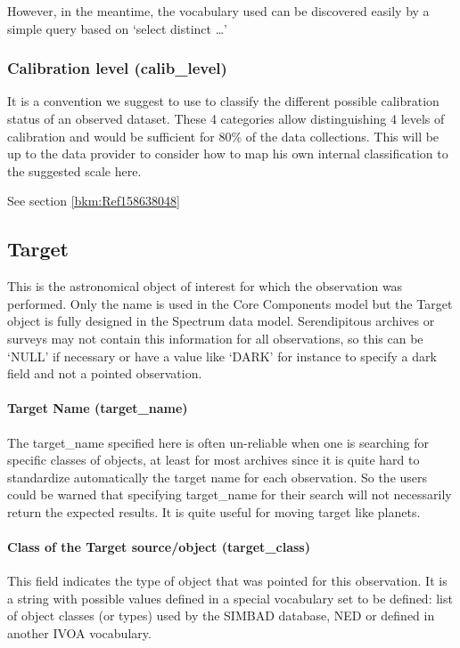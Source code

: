 \documentclass[11pt,a4paper]{ivoa}
\begin{document}
However, in the meantime, the vocabulary used can be discovered easily by a simple query based on `select distinct
{\dots}'

\subsubsection{Calibration level (calib\_level)}
It is a convention we suggest to use to classify the different possible calibration status of an observed dataset.
These 4 categories allow distinguishing 4 levels of calibration and would be sufficient for 80\% of the data
collections.  This will be up to the data provider to consider how to map his own internal classification to the
suggested scale here.

See section \ref{bkm:Ref158638048}

\subsection{Target}
This is the astronomical object of interest for which the observation was performed. Only the name is used in the Core
Components model but the Target object is fully designed in the Spectrum data model. Serendipitous archives or surveys
may not contain this information for all observations, so this can be `NULL' if necessary or have a value like `DARK'
for instance to specify a dark field and not a pointed observation.

\paragraph{Target Name (target\_name)}
The target\_name specified here is often un-reliable when one is searching for specific classes of objects, at least for
most archives since it is quite hard to standardize automatically the target name for each observation. So the users
could be warned that specifying target\_name for their search will not necessarily return the expected results. It is
quite useful for moving target like planets.

\paragraph{Class of the Target source/object (target\_class)}
This field indicates the type of object that was pointed for this observation. It is a string with possible values
defined in a special vocabulary set to be defined: list of object classes (or types) used by the SIMBAD database, NED
or defined in another IVOA vocabulary.
\end{document}
